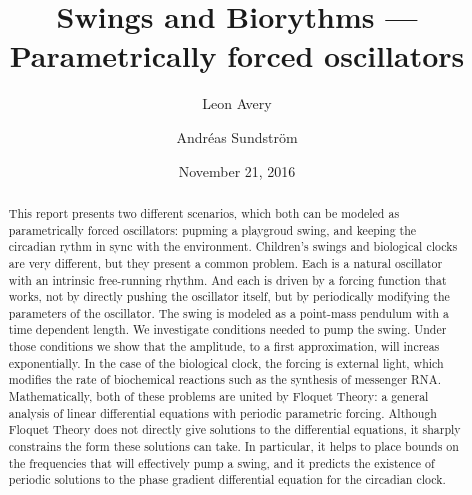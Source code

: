 \documentclass[11pt,letter, english,%
]{article}
\begin{document}

\title{\vspace{-1cm}
Swings and Biorythms --- Parametrically forced oscillators}
\author{Leon Avery \and Andréas Sundstr{\"o}m}
\date{November 21, 2016}

\maketitle

\begin{abstract}\noindent
This report presents two different scenarios, which both can be
modeled as parametrically forced oscillators: pupming a playgroud
swing, and keeping the circadian rythm in sync with the
environment. 
Children's swings and biological clocks are very different, but they
present a common problem. Each is a natural oscillator with an
intrinsic free-running rhythm. And each is driven by a forcing
function that works, not by directly pushing the oscillator itself,
but by periodically modifying the parameters of the oscillator.
The swing is modeled as a point-mass pendulum with a time
dependent length. We investigate conditions needed to pump the
swing. Under those conditions we show that the amplitude, to a first
approximation, will increas exponentially.
In the case of the biological clock, the forcing is external light,
which modifies the rate of biochemical reactions such as the synthesis
of messenger RNA. 
Mathematically, both of these problems are
united by Floquet Theory: a general analysis of linear differential
equations with periodic parametric forcing. Although Floquet Theory
does not directly give solutions to the differential equations, it
sharply constrains the form these solutions can take. In particular,
it helps to place bounds on the frequencies that will effectively pump
a swing, and it predicts the existence of periodic solutions to the
phase gradient differential equation for the circadian clock.  



\end{abstract}
\end{document}
